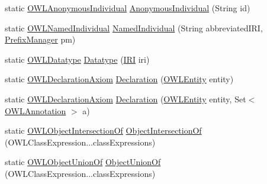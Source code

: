 \begin{DoxyCompactItemize}
\item 
static \hyperlink{interfaceorg_1_1semanticweb_1_1owlapi_1_1model_1_1_o_w_l_anonymous_individual}{O\-W\-L\-Anonymous\-Individual} \hyperlink{classorg_1_1semanticweb_1_1owlapi_1_1apibinding_1_1_o_w_l_functional_syntax_factory_a5c7fc936ef420db1648a6523d482bdd5}{Anonymous\-Individual} (String id)
\item 
static \hyperlink{interfaceorg_1_1semanticweb_1_1owlapi_1_1model_1_1_o_w_l_named_individual}{O\-W\-L\-Named\-Individual} \hyperlink{classorg_1_1semanticweb_1_1owlapi_1_1apibinding_1_1_o_w_l_functional_syntax_factory_a7952a40c3a1a1eb3f0db6c807a2b4a46}{Named\-Individual} (String abbreviated\-I\-R\-I, \hyperlink{interfaceorg_1_1semanticweb_1_1owlapi_1_1model_1_1_prefix_manager}{Prefix\-Manager} pm)
\item 
static \hyperlink{interfaceorg_1_1semanticweb_1_1owlapi_1_1model_1_1_o_w_l_datatype}{O\-W\-L\-Datatype} \hyperlink{classorg_1_1semanticweb_1_1owlapi_1_1apibinding_1_1_o_w_l_functional_syntax_factory_aa02abf2db437084f42792d07e7dbd14c}{Datatype} (\hyperlink{classorg_1_1semanticweb_1_1owlapi_1_1model_1_1_i_r_i}{I\-R\-I} iri)
\item 
static \hyperlink{interfaceorg_1_1semanticweb_1_1owlapi_1_1model_1_1_o_w_l_declaration_axiom}{O\-W\-L\-Declaration\-Axiom} \hyperlink{classorg_1_1semanticweb_1_1owlapi_1_1apibinding_1_1_o_w_l_functional_syntax_factory_ac145fcacb3a40bcc13fe145852bc4286}{Declaration} (\hyperlink{interfaceorg_1_1semanticweb_1_1owlapi_1_1model_1_1_o_w_l_entity}{O\-W\-L\-Entity} entity)
\item 
static \hyperlink{interfaceorg_1_1semanticweb_1_1owlapi_1_1model_1_1_o_w_l_declaration_axiom}{O\-W\-L\-Declaration\-Axiom} \hyperlink{classorg_1_1semanticweb_1_1owlapi_1_1apibinding_1_1_o_w_l_functional_syntax_factory_a9c8a9e18310c23473ae6c3f551689026}{Declaration} (\hyperlink{interfaceorg_1_1semanticweb_1_1owlapi_1_1model_1_1_o_w_l_entity}{O\-W\-L\-Entity} entity, Set$<$ \hyperlink{interfaceorg_1_1semanticweb_1_1owlapi_1_1model_1_1_o_w_l_annotation}{O\-W\-L\-Annotation} $>$ a)
\item 
static \hyperlink{interfaceorg_1_1semanticweb_1_1owlapi_1_1model_1_1_o_w_l_object_intersection_of}{O\-W\-L\-Object\-Intersection\-Of} \hyperlink{classorg_1_1semanticweb_1_1owlapi_1_1apibinding_1_1_o_w_l_functional_syntax_factory_a9267ff7424ccbb06e5a76016b95bd712}{Object\-Intersection\-Of} (O\-W\-L\-Class\-Expression...\-class\-Expressions)
\item 
static \hyperlink{interfaceorg_1_1semanticweb_1_1owlapi_1_1model_1_1_o_w_l_object_union_of}{O\-W\-L\-Object\-Union\-Of} \hyperlink{classorg_1_1semanticweb_1_1owlapi_1_1apibinding_1_1_o_w_l_functional_syntax_factory_abe1d48171930c86efc60443966507bd4}{Object\-Union\-Of} (O\-W\-L\-Class\-Expression...\-class\-Expressions)

\end{DoxyCompactItemize}
